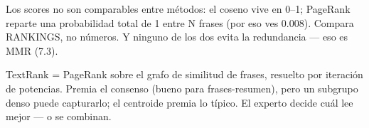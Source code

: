 \documentclass[11pt,a4paper]{article}
\begin{document}
\begin{ojo}
Los scores no son comparables entre métodos: el coseno vive en 0--1; PageRank reparte una
probabilidad total de 1 entre N frases (por eso ves 0.008). Compara RANKINGS, no números.
Y ninguno de los dos evita la redundancia --- eso es MMR (7.3).
\end{ojo}

\begin{resumen}
TextRank = PageRank sobre el grafo de similitud de frases, resuelto por iteración de
potencias. Premia el consenso (bueno para frases-resumen), pero un subgrupo denso puede
capturarlo; el centroide premia lo típico. El experto decide cuál lee mejor --- o se
combinan.
\end{resumen}
\end{document}
